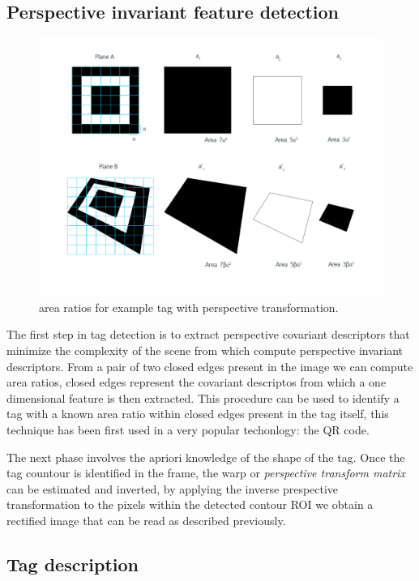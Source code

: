 \documentclass[a4paper]{report}
\begin{document}
\subsection{Perspective invariant feature detection}
\begin{figure}[H]
    \centering
    \includegraphics[scale=0.2]{area_ratio.png}
    \caption{area ratios for example tag with perspective transformation.}
\end{figure}
The first step in tag detection is to extract perspective covariant descriptors that minimize the complexity of the scene from which compute perspective invariant descriptors.
From a pair of two closed edges present in the image we can compute area ratios, closed edges represent the covariant descriptos from which a one dimensional feature is then extracted. This procedure can be used to identify a tag with a known area ratio within closed edges present in the tag itself, this technique has been first used in a very popular techonlogy: the QR code\cite{QR}.

The next phase involves the apriori knowledge of the shape of the tag.
Once the tag countour is identified in the frame, the warp or \textit{perspective transform matrix} can be estimated and inverted, by applying the inverse prespective transformation to the pixels within the detected contour ROI we obtain a rectified image that can be read as described previously.

\subsection{Tag description}
\end{document}
